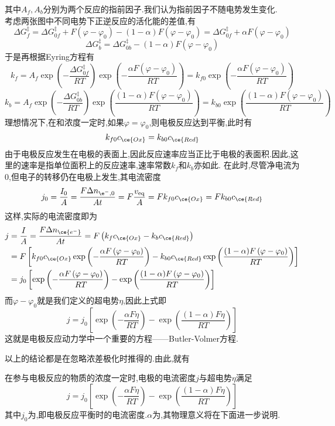 \documentclass{ctexart}
\begin{document}
\begin{derivation}
    其中$A_f,A_b$分别为两个反应的指前因子.我们认为指前因子不随电势发生变化.\\
    考虑两张图中不同电势下正逆反应的活化能的差值,有
    \[\Delta G_{f}^\ddagger=\Delta G_{0f}^\ddagger+F\left(\varphi-\varphi_0\right)-(1-\alpha)F\left(\varphi-\varphi_0\right)
    =\Delta G_{0f}^\ddagger+\alpha F\left(\varphi-\varphi_0\right)\]
    \[\Delta G_{b}^\ddagger=\Delta G_{0b}^\ddagger-(1-\alpha)F\left(\varphi-\varphi_0\right)\]
    于是再根据Eyring方程有
    \[k_f=A_f\exp\left(-\dfrac{\Delta G_{0f}^\ddagger}{RT}\right)\exp\left(-\dfrac{\alpha F\left(\varphi-\varphi_0\right)}{RT}\right)
    =k_{f0}\exp\left(-\dfrac{\alpha F\left(\varphi-\varphi_0\right)}{RT}\right)\]
    \[k_b=A_f\exp\left(-\dfrac{\Delta G_{0b}^\ddagger}{RT}\right)\exp\left(\dfrac{(1-\alpha)F\left(\varphi-\varphi_0\right)}{RT}\right)
    =k_{b0}\exp\left(\dfrac{(1-\alpha)F\left(\varphi-\varphi_0\right)}{RT}\right)\]
    理想情况下,在和浓度一定时,如果$\varphi=\varphi_0$,则电极反应达到平衡,此时有
    \[k_{f0}c_{\ce{Ox}}=k_{b0}c_{\ce{Red}}\]
    由于电极反应发生在电极的表面上,因此反应速率应当正比于电极的表面积.因此,这里的速率是指单位面积上的反应速率,速率常数$k_f$和$k_b$亦如此.%
    在此时,尽管净电流为$0$,但电子的转移仍在电极上发生,其电流密度
    \[j_0=\dfrac{I_0}{A}=\dfrac{F\Delta n_{\e^-,0}}{At}=F\dfrac{v_{\text{eq}}}{A}=Fk_{f0}c_{\ce{Ox}}=Fk_{b0}c_{\ce{Red}}\]
    这样,实际的电流密度即为
    \[\begin{aligned}
        j
        &= \dfrac{I}{A}=\dfrac{F\Delta n_{\ce{e^-}}}{At}=F\left(k_fc_{\ce{Ox}}-k_bc_{\ce{Red}}\right) \\
        &= F\left[k_{f0}c_{\ce{Ox}}\exp\left(-\dfrac{\alpha F\left(\varphi-\varphi_0\right)}{RT}\right)-k_{b0}c_{\ce{Red}}\exp\left(\dfrac{(1-\alpha)F\left(\varphi-\varphi_0\right)}{RT}\right)\right] \\
        &= j_0\left[\exp\left(-\dfrac{\alpha F\left(\varphi-\varphi_0\right)}{RT}\right)-\exp\left(\dfrac{(1-\alpha)F\left(\varphi-\varphi_0\right)}{RT}\right)\right]
    \end{aligned}\]
    而$\varphi-\varphi_0$就是我们定义的超电势$\eta$,因此上式即
    \[j=j_0\left[\exp\left(-\dfrac{\alpha F\eta}{RT}\right)-\exp\left(\dfrac{(1-\alpha)F\eta}{RT}\right)\right]\]
    这就是电极反应动力学中一个重要的方程——Butler-Volmer方程.
\end{derivation}
以上的结论都是在忽略浓差极化时推得的.由此,就有
\begin{theorem}
    在参与电极反应的物质的浓度一定时,电极的电流密度$j$与超电势$\eta$满足
    \[j=j_0\left[\exp\left(-\dfrac{\alpha F\eta}{RT}\right)-\exp\left(\dfrac{(1-\alpha)F\eta}{RT}\right)\right]\]
    其中$j_0$为,即电极反应平衡时的电流密度.$\alpha$为,其物理意义将在下面进一步说明.
\end{theorem}
\end{document}
